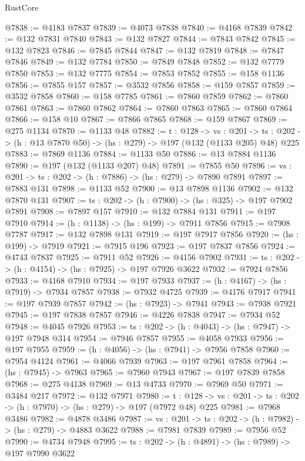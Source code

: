 \begin{lexlean}{RustCore}
\begin{coremodule}
@7838 := @4183 @7837
@7839 := @4073 @7838
@7840 := @4168 @7839
@7842 := @132 @7831 @7840
@7843 := @132 @7827
@7844 := @7843 @7842
@7845 := @132 @7823
@7846 := @7845 @7844
@7847 := @132 @7819
@7848 := @7847 @7846
@7849 := @132 @7784
@7850 := @7849 @7848
@7852 := @132 @7779 @7850
@7853 := @132 @7775
@7854 := @7853 @7852
@7855 := @158 @1136
@7856 := @7855 @157
@7857 := @3532 @7856
@7858 := @159 @7857
@7859 := @3532 @7858
@7860 := @158 @7785
@7861 := @7860 @7859
@7862 := @7860 @7861
@7863 := @7860 @7862
@7864 := @7860 @7863
@7865 := @7860 @7864
@7866 := @158 @10
@7867 := @7866 @7865
@7868 := @159 @7867
@7869 := @275 @1134
@7870 := @1133 @48
@7882 := {t : @128} ->
  {vs : @201} ->
  {ts : @202} -> (h : @13 @7870 @50) -> (hs : @279) -> @197 (@132 (@1133 @205) @48) @225
@7883 := @7869 @1136
@7884 := @1133 @50
@7886 := @13 @7884 @1136
@7890 := @197 (@132 (@1133 @207) @48)
@7891 := @7855 @50
@7896 := {vs : @201} -> {ts : @202} -> (h : @7886) -> (hs : @279) -> @7890 @7891
@7897 := @7883 @131
@7898 := @1133 @52
@7900 := @13 @7898 @1136
@7902 := @132 @7870 @131
@7907 := {ts : @202} -> (h : @7900) -> (hs : @325) -> @197 @7902 @7891
@7908 := @7897 @157
@7910 := @132 @7884 @131
@7911 := @197 @7910
@7914 := (h : @1138) -> (hs : @199) -> @7911 @7856
@7915 := @7908 @7787
@7917 := @132 @7898 @131
@7919 := @197 @7917 @7856
@7920 := (hs : @199) -> @7919
@7921 := @7915 @196
@7923 := @197 @7837 @7856
@7924 := @4743 @7837
@7925 := @7911 @52
@7926 := @4156 @7902
@7931 := {ts : @202} -> (h : @4154) -> (hs : @7925) -> @197 @7926 @3622
@7932 := @7924 @7856
@7933 := @4168 @7910
@7934 := @197 @7933
@7937 := (h : @4167) -> (hs : @7919) -> @7934 @7857
@7938 := @7932 @4725
@7939 := @4176 @7917
@7941 := @197 @7939 @7857
@7942 := (hs : @7923) -> @7941
@7943 := @7938 @7921
@7945 := @197 @7838 @7857
@7946 := @4226 @7838
@7947 := @7934 @52
@7948 := @4045 @7926
@7953 := {ts : @202} -> (h : @4043) -> (hs : @7947) -> @197 @7948 @314
@7954 := @7946 @7857
@7955 := @4058 @7933
@7956 := @197 @7955
@7959 := (h : @4056) -> (hs : @7941) -> @7956 @7858
@7960 := @7954 @4124
@7961 := @4066 @7939
@7963 := @197 @7961 @7858
@7964 := (hs : @7945) -> @7963
@7965 := @7960 @7943
@7967 := @197 @7839 @7858
@7968 := @275 @4138
@7969 := @13 @4733
@7970 := @7969 @50
@7971 := @3484 @217
@7972 := @132 @7971
@7980 := {t : @128} ->
  {vs : @201} -> {ts : @202} -> (h : @7970) -> (hs : @279) -> @197 (@7972 @48) @225
@7981 := @7968 @3486
@7982 := @4878 @3486
@7987 := {vs : @201} -> {ts : @202} -> (h : @7982) -> (hs : @279) -> @4883 @3622
@7988 := @7981 @7839
@7989 := @7956 @52
@7990 := @4734 @7948
@7995 := {ts : @202} -> (h : @4891) -> (hs : @7989) -> @197 @7990 @3622

\end{coremodule}
\end{lexlean}
